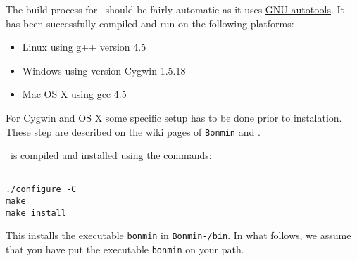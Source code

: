 \begin{PageSummary}
\end{PageSummary}

\begin{quickref}
\end{quickref}
The build process for \Bonmin\ should be fairly automatic as it uses
\href{http://sources.redhat.com/autobook/autobook/}{GNU autotools}.
  It has been successfully compiled and run on the following platforms:
\begin{itemize}
\item Linux using g++ version 4.5
\item Windows using version Cygwin 1.5.18
\item Mac OS X using gcc 4.5
\end{itemize}

For Cygwin and OS X some specific setup has to be done prior to instalation. These step are described on the wiki pages of {\tt Bonmin}   and .


\Bonmin\ is compiled and installed using the commands:
\begin{colorverb}
\begin{verbatim}

./configure -C
make
make install

\end{verbatim}
\end{colorverb}

This installs the executable {\tt bonmin} in {\tt Bonmin-\stableVersion/bin}. In what follows, we assume
that you have put the executable {\tt bonmin} on your path.

